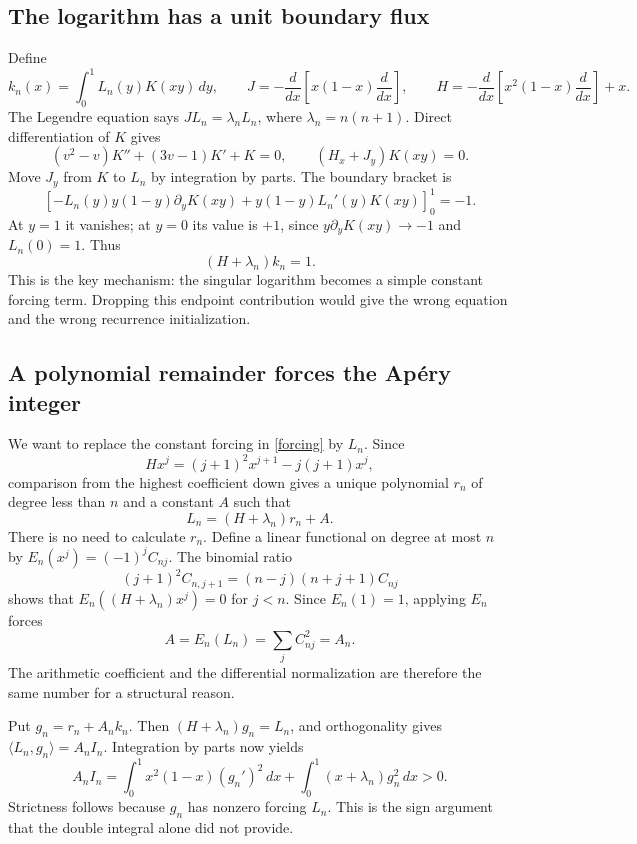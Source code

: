 \documentclass[11pt]{article}
\newcommand{\dd}{\,d}
\newcommand{\ip}[2]{\langle #1,#2\rangle}
\begin{document}
\subsection{The logarithm has a unit boundary flux}
Define
\[
 k_n(x)=\int_0^1L_n(y)K(xy)\dd y,\qquad
 J=-\frac d{dx}\left[x(1-x)\frac d{dx}\right],\qquad
 H=-\frac d{dx}\left[x^2(1-x)\frac d{dx}\right]+x.
\]
The Legendre equation says $JL_n=\lambda_nL_n$, where $\lambda_n=n(n+1)$. Direct differentiation of $K$ gives
\[
 (v^2-v)K''+(3v-1)K'+K=0,
 \qquad (H_x+J_y)K(xy)=0.
\]
Move $J_y$ from $K$ to $L_n$ by integration by parts. The boundary bracket is
\[
 [-L_n(y)y(1-y)\partial_yK(xy)
       +y(1-y)L_n'(y)K(xy)]_0^1=-1.
\]
At $y=1$ it vanishes; at $y=0$ its value is $+1$, since
$y\partial_yK(xy)\to-1$ and $L_n(0)=1$. Thus
\begin{equation}\label{forcing}
 (H+\lambda_n)k_n=1.
\end{equation}
This is the key mechanism: the singular logarithm becomes a simple constant forcing term. Dropping this endpoint contribution would give the wrong equation and the wrong recurrence initialization.

\subsection{A polynomial remainder forces the Ap\'ery integer}
We want to replace the constant forcing in \eqref{forcing} by $L_n$. Since
\begin{equation}\label{monomial}
 Hx^j=(j+1)^2x^{j+1}-j(j+1)x^j,
\end{equation}
comparison from the highest coefficient down gives a unique polynomial $r_n$ of degree less than $n$ and a constant $A$ such that
\[
 L_n=(H+\lambda_n)r_n+A.
\]
There is no need to calculate $r_n$. Define a linear functional on degree at most $n$ by $E_n(x^j)=(-1)^jC_{nj}$. The binomial ratio
\[
 (j+1)^2C_{n,j+1}=(n-j)(n+j+1)C_{nj}
\]
shows that $E_n((H+\lambda_n)x^j)=0$ for $j<n$. Since $E_n(1)=1$, applying $E_n$ forces
\[
 A=E_n(L_n)=\sum_j C_{nj}^2=A_n.
\]
The arithmetic coefficient and the differential normalization are therefore the same number for a structural reason.

Put $g_n=r_n+A_nk_n$. Then $(H+\lambda_n)g_n=L_n$, and orthogonality gives $\ip{L_n}{g_n}=A_nI_n$. Integration by parts now yields
\begin{equation}\label{energy}
 A_nI_n=\int_0^1x^2(1-x)(g_n')^2\dd x+
           \int_0^1(x+\lambda_n)g_n^2\dd x>0.
\end{equation}
Strictness follows because $g_n$ has nonzero forcing $L_n$. This is the sign argument that the double integral alone did not provide.
\end{document}
